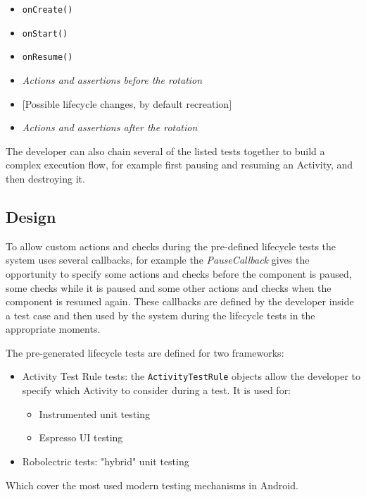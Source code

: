 \documentclass[11pt,a4paper,notitlepage]{article}
\begin{document}
\begin{itemize}
	\begin{itemize}
		\item \texttt{onCreate()}
		\item \texttt{onStart()}
		\item \texttt{onResume()}
		\item \textit{Actions and assertions before the rotation}
		\item $[$Possible lifecycle changes, by default recreation$]$
		\item \textit{Actions and assertions after the rotation}
	\end{itemize}
\end{itemize}
The developer can also chain several of the listed tests together to build a complex execution flow, for example first pausing and resuming an Activity, and then destroying it.

\subsection{Design}
To allow custom actions and checks during the pre-defined lifecycle tests the system uses several callbacks, for example the \textit{PauseCallback} gives the opportunity to specify some actions and checks before the component is paused, some checks while it is paused and some other actions and checks when the component is resumed again. These callbacks are defined by the developer inside a test case and then used by the system during the lifecycle tests in the appropriate moments.

The pre-generated lifecycle tests are defined for two frameworks:
\begin{itemize}
	\item Activity Test Rule tests: the \texttt{ActivityTestRule} objects allow the developer to specify which Activity to consider during a test. It is used for:
	\begin{itemize}
		\item Instrumented unit testing
		\item Espresso UI testing
	\end{itemize}
	\item Robolectric tests: "hybrid" unit testing
\end{itemize}
Which cover the most used modern testing mechanisms in Android.
\end{document}
